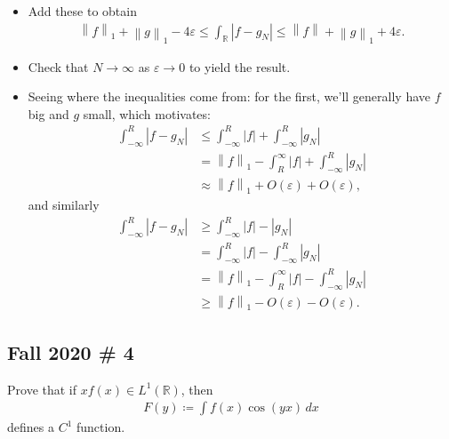 \begin{solution}
\begin{itemize}
\item
  Add these to obtain
  \begin{align*}
  {\left\lVert {f} \right\rVert}_1 + {\left\lVert {g} \right\rVert}_1 - 4\varepsilon\leq \int_{\mathbb{R}}{\left\lvert {f - g_N} \right\rvert} \leq {\left\lVert {f} \right\rVert} + {\left\lVert {g} \right\rVert}_1 + 4\varepsilon
  .\end{align*}
\item
  Check that \(N\to \infty\) as \(\varepsilon\to 0\) to yield the
  result.
\item
  Seeing where the inequalities come from: for the first, we'll
  generally have \(f\) big and \(g\) small, which motivates:
  \begin{align*}
  \int_{-\infty}^R {\left\lvert {f - g_N} \right\rvert} 
  &\leq \int_{- \infty }^R {\left\lvert {f} \right\rvert} + \int_{- \infty }^R {\left\lvert {g_N} \right\rvert} \\
  &= {\left\lVert {f} \right\rVert}_1 - \int_R^{\infty } {\left\lvert {f} \right\rvert} + \int_{- \infty }^R {\left\lvert {g_N} \right\rvert} \\
  &\approx {\left\lVert {f} \right\rVert}_1 + O(\varepsilon) + O(\varepsilon)
  ,\end{align*}
  and similarly
  \begin{align*}
  \int_{- \infty }^R {\left\lvert { f- g_N} \right\rvert} 
  &\geq \int_{- \infty }^R {\left\lvert {f} \right\rvert} - {\left\lvert {g_N} \right\rvert} \\
  &= \int_{- \infty }^R {\left\lvert {f} \right\rvert} - \int_{- \infty }^R {\left\lvert {g_N} \right\rvert} \\
  &= {\left\lVert {f} \right\rVert}_1 - \int_R^{\infty } {\left\lvert {f} \right\rvert} - \int_{- \infty }^R {\left\lvert {g_N} \right\rvert} \\
  &\geq {\left\lVert {f} \right\rVert}_1 - O(\varepsilon) - O(\varepsilon)
  .\end{align*}
\end{itemize}

\end{solution}

\hypertarget{fall-2020-4}{%
\subsection{Fall 2020 \# 4}\label{fall-2020-4}}

Prove that if \(xf(x) \in L^1({\mathbb{R}})\), then
\begin{align*}  
F(y) \coloneqq\int f(x) \cos(yx)\,  dx
\end{align*}
defines a \(C^1\) function.

